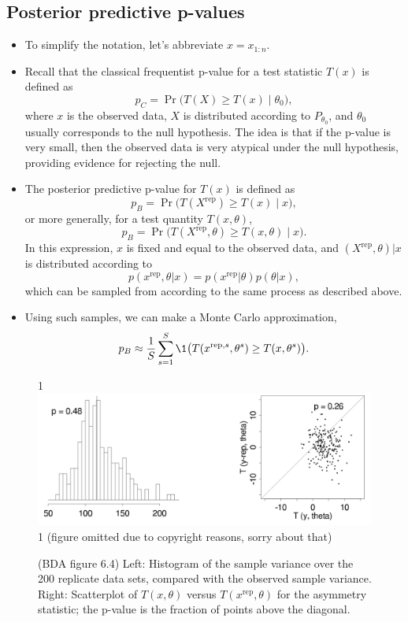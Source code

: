 \documentclass[12pt]{article}
\newcommand{\blind}{1}
\newcommand{\rep}{\text{rep}}
\begin{document}
\subsection*{Posterior predictive p-values}
\begin{itemize}
\item To simplify the notation, let's abbreviate $x = x_{1:n}$.
\item Recall that the classical frequentist p-value for a test statistic $T(x)$ is defined as
$$p_C = \Pr\big(T(X)\geq T(x) \mid \theta_0 \big),$$
where $x$ is the observed data, $X$ is distributed according to $P_{\theta_0}$, and $\theta_0$ usually corresponds to the null hypothesis. The idea is that if the p-value is very small, then the observed data is very atypical under the null hypothesis, providing evidence for rejecting the null.
\item The posterior predictive p-value for $T(x)$ is defined as
$$p_B = \Pr\big(T(X^\rep)\geq T(x) \mid x \big),$$
or more generally, for a test quantity $T(x,\theta)$,
$$p_B = \Pr\big(T(X^\rep,\theta)\geq T(x,\theta) \mid x \big).$$
In this expression, $x$ is fixed and equal to the observed data, and $(X^\rep,\theta) | x$ is distributed according to 
$$p(x^\rep,\theta | x) = p(x^\rep | \theta) p(\theta | x), $$
which can be sampled from according to the same process as described above.
\item Using such samples, we can make a Monte Carlo approximation,
$$ p_B \approx \frac{1}{S}\sum_{s = 1}^S \1 \big(T(x^{\rep,s},\theta^s)\geq T(x,\theta^s) \big). $$
\end{itemize}

\begin{figure}
\begin{center}
\blind {
\includegraphics[width=1.0\textwidth]{newcomb-more.png}
} \fi
{}\blind { (figure omitted due to copyright reasons, sorry about that) } \fi
\end{center}
\caption{(BDA figure 6.4) Left: Histogram of the sample variance over the 200 replicate data sets, compared with the observed sample variance. Right: Scatterplot of $T(x,\theta)$ versus $T(x^\rep,\theta)$ for the asymmetry statistic; the p-value is the fraction of points above the diagonal.}
\label{figure:newcomb-more}
\end{figure}
\end{document}
